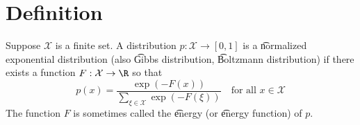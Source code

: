 
\section*{Definition}

Suppose $\mathcal{X} $ is a finite set.
A distribution $p: \mathcal{X}  \to [0,1]$ is a \t{normalized exponential distribution} (also \t{Gibbs distribution}, \t{Boltzmann distribution}) if there exists a function $F: \mathcal{X}  \to \R $ so that
\[
p(x) = \frac{\exp(-F(x))}{\sum_{\xi  \in \mathcal{X} } \exp(-F(\xi ))} \quad \text{for all } x \in \mathcal{X}
\]
The function $F$ is sometimes called the \t{energy} (or \t{energy function}) of $p$.


\blankpage